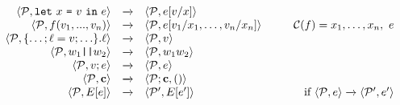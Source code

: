 $$
\begin{array}{rcl@{\hspace{10mm}}r}
\config{\prog}{\elet{x}{v}{e}} &\redx& \config{\prog}{e[v/x]}\\
\config{\prog}{f(v_1,...,v_n)} &\redx&
\config{\prog}{e[v_1/x_1,\ldots,v_n/x_n]} & 
 \codebase(f) = x_1,\ldots,x_n,\ e\\
\config{\prog}{\{\ldots; \flab = v; \ldots\}.\flab} &\redx&
 \config{\prog}{v}\\
 \config{\prog}{w_1\ttt{||}w_2} &\redx& \config{\prog}{w_1w_2}\\
 \config{\prog}{v;e} &\redx& \config{\prog}{e}\\
\config{\prog}{\instr} &\redx& \config{\prog;\instr}{()}\\
\config{\prog}{E[e]} &\redx& \config{\prog'}{E[e']} & \text{if}\ \config{\prog}{e} \redx \config{\prog'}{e'} 
\end{array}
$$
